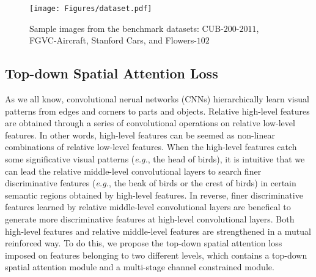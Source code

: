 \documentclass[journal]{IEEEtran}
\begin{document}
\begin{figure*}[!t]
    \begin{center}
   \texttt{[image: Figures/dataset.pdf]}

    \end{center}
    \caption{Sample images from the benchmark datasets: CUB-$200$-$2011$, FGVC-Aircraft, Stanford Cars, and Flowers-$102$}
    \label{fig:dataset}
\end{figure*}

\subsection{Top-down Spatial Attention Loss}\label{section:Cross-layer}


As we all know, convolutional nerual networks (CNNs) hierarchically learn visual patterns from edges and corners to parts and objects. Relative high-level features are obtained through a series of convolutional operations on relative low-level features. In other words, high-level features can be seemed as non-linear combinations of relative low-level features. When the high-level features catch some significative visual patterns (\emph{e.g.}, the head of birds), it is intuitive that we can lead the relative middle-level convolutional layers to search finer discriminative features (\emph{e.g.}, the beak of birds or the crest of birds) in certain semantic regions obtained by high-level features. In reverse, finer discriminative features learned by relative middle-level convolutional layers are benefical to generate more discriminative features at high-level convolutional layers. Both high-level features and relative middle-level features are strengthened in a mutual reinforced way. To do this, we propose the top-down spatial attention loss imposed on features belonging to two different levels, which contains a top-down spatial attention module and a multi-stage channel constrained module.
\end{document}
